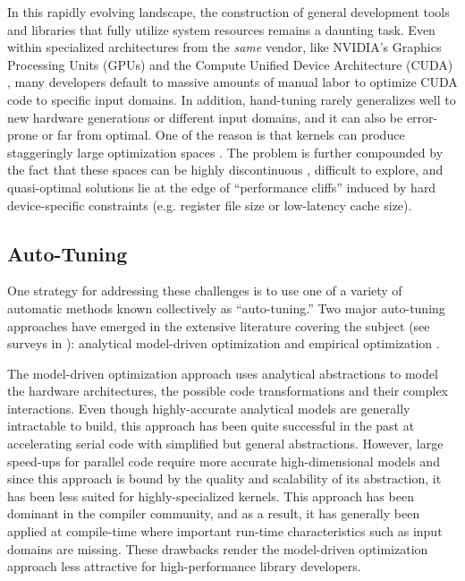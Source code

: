 \documentclass{sig-alternate}
\begin{document}
In this rapidly evolving landscape, the construction of general
development tools and libraries that fully utilize system resources
remains a daunting task. Even within specialized architectures from the
\emph{same} vendor, like NVIDIA's Graphics Processing Units (GPUs) and the
Compute Unified Device Architecture (CUDA) \citep{nickolls2008scalable,
nvidia2011cuda}, many developers default to massive amounts of manual labor
to optimize CUDA code to specific input domains. In addition, hand-tuning
rarely generalizes well to new hardware generations or different input
domains, and it can also be error-prone or far from optimal. One of the
reason is that kernels can produce staggeringly large optimization spaces
\citep{datta2008stencil}. The problem is further compounded by the fact that
these spaces can be highly discontinuous \citep{ryoo2008program}, difficult
to explore, and quasi-optimal solutions lie at the edge of ``performance
cliffs'' induced by hard device-specific constraints (e.g. register file
size or low-latency cache size).

\subsection{Auto-Tuning}


One strategy for addressing these challenges is to use one of a variety of
automatic methods known collectively as ``auto-tuning.'' Two major auto-tuning
approaches have emerged in the extensive literature covering the subject (see
surveys in
\citep{vuduc2001statistical, demmel2005self, vuduc2005oski, williams2008auto,
datta2008stencil, cavazos2008intelligent, li2009note, park2011evaluation}):
analytical model-driven optimization and empirical optimization
\citep{yotov2003comparison}.


The model-driven optimization approach uses analytical abstractions to model
the hardware architectures, the possible code transformations and their complex
interactions. Even though highly-accurate analytical models are generally
intractable to build, this approach has been quite successful in the past at
accelerating serial code with simplified but general abstractions. However,
large speed-ups for parallel code require more accurate high-dimensional models
and since this approach is bound by the quality and scalability of its
abstraction, it has been less suited for highly-specialized kernels. This
approach has been dominant in the compiler community, and as a result, it has
generally been applied at compile-time where important run-time characteristics
such as input domains are missing. These drawbacks render the model-driven
optimization approach less attractive for high-performance library developers.
\end{document}
